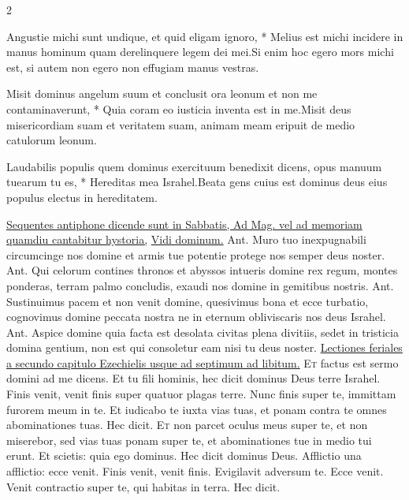 \begin{multicols*}{2}
\begin{responsory}
{Angustie michi sunt undique, et quid eligam ignoro, * Melius est michi incidere in manus hominum quam derelinquere legem dei mei.}{Si enim hoc egero mors michi est, si autem non egero non effugiam manus vestras.}
\end{responsory}%
\begin{responsory}
{Misit dominus angelum suum et conclusit ora leonum et non me contaminaverunt, * Quia coram eo iusticia inventa est in me.}{Misit deus misericordiam suam et veritatem suam, animam meam eripuit de medio catulorum leonum.}
\end{responsory}%
\begin{responsory-doxology}
{Laudabilis populis quem dominus exercituum benedixit dicens, opus manuum tuearum tu es, * Hereditas mea Israhel.}{Beata gens cuius est dominus deus eius populus electus in hereditatem.}
\end{responsory-doxology}%
\newline \ul{Sequentes antiphone dicende sunt in Sabbatis, Ad Mag. vel ad memoriam quamdiu cantabitur hystoria,} \hyperlink{vidi-dominum}{Vidi dominum.} {\color{Red} Ant.} Muro tuo inexpugnabili circumcinge nos domine et armis tue potentie protege nos semper deus noster. {\color{Red} Ant.} Qui celorum contines thronos et abyssos intueris domine rex regum, montes ponderas, terram palmo concludis, exaudi nos domine in gemitibus nostris. {\color{Red} Ant.} Sustinuimus pacem et non venit domine, quesivimus bona et ecce turbatio, cognovimus domine peccata nostra ne in eternum obliviscaris nos deus Israhel. {\color{Red} Ant.} Aspice domine quia facta est desolata civitas plena divitiis, sedet in tristicia domina gentium, non est qui consoletur eam nisi tu deus noster.
\newline \ul{Lectiones feriales a secundo capitulo Ezechielis usque ad septimum ad libitum.}
{\color{Red} }
\lettrine[lines=2]{\zallmancaps \color{Red} E}{t} factus est sermo domini ad me dicens. Et tu fili hominis, hec dicit dominus Deus terre Israhel. Finis venit, venit finis super quatuor plagas terre. Nunc finis super te, immittam furorem meum in te. Et iudicabo te iuxta vias tuas, et ponam contra te omnes abominationes tuas. Hec dicit.
\lettrine[lines=2]{\zallmancaps \color{Blue} E}{t} non parcet oculus meus super te, et non miserebor, sed vias tuas ponam super te, et abominationes tue in medio tui erunt. Et scietis: quia ego dominus. Hec dicit dominus Deus. Afflictio una afflictio: ecce venit. Finis venit, venit finis. Evigilavit adversum te. Ecce venit. Venit contractio super te, qui habitas in terra. Hec dicit.

\end{multicols*}
